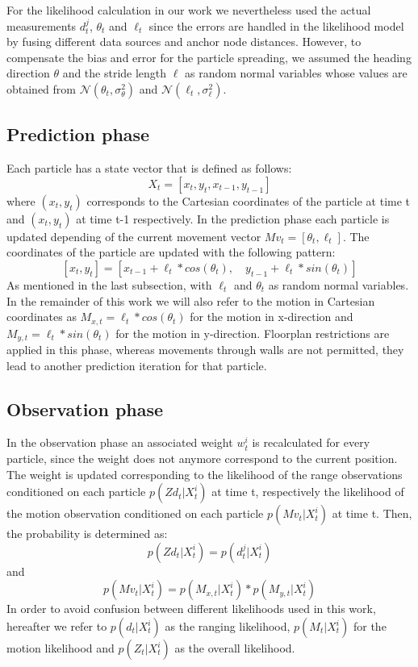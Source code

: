 For the likelihood calculation in our work we nevertheless used the actual measurements $d^{j}_{t}$, $\theta_{t}$ and $\ell_{t}$ since the errors are handled in the likelihood model by fusing different data sources and anchor node distances. However, to compensate the bias and error for the particle spreading, we assumed the heading direction $\theta$ and the stride length $\ell$ as random normal variables whose values are obtained from $\mathcal{N}(\theta_{t}, \sigma_{\theta}^{2})$ and $\mathcal{N}(\ell_{t}, \sigma_{\ell}^{2})$.



\subsection{Prediction phase}
Each particle has a state vector that is defined as follows:
$$X_{t} = [x_{t}, y_{t}, x_{t-1}, y_{t-1}]$$
where $(x_{t}, y_{t})$ corresponds to the Cartesian coordinates of the particle at time t and $(x_{t}, y_{t})$ at time t-1 respectively. In the prediction phase each particle is updated depending of the current movement vector $Mv_{t} = [\theta_{t}, \ell_{t}]$. The coordinates of the particle are updated with the following pattern:
$$[x_{t}, y_{t}]  = [x_{t-1} + \ell_{t} * cos(\theta_{t}),\quad y_{t-1} + \ell_{t} * sin(\theta_{t})]$$
As mentioned in the last subsection, with $\ell_{t}$ and $\theta_{t}$ as random normal variables. In the remainder of this work we will also refer to the motion in Cartesian coordinates as $M_{x,t} = \ell_{t} * cos(\theta_{t})$ for the motion in x-direction and $M_{y,t} = \ell_{t} * sin(\theta_{t})$ for the motion in y-direction.
Floorplan restrictions are applied in this phase, whereas movements through walls are not permitted, they lead to another prediction iteration for that particle.

\subsection{Observation phase}
In the observation phase an associated weight $w^{i}_{t}$ is recalculated for every particle, since the weight does not anymore correspond to the current position. The weight is updated corresponding to the likelihood of the range observations conditioned on each particle $p(Zd_{t} | X^{i}_{t})$ at time t, respectively the likelihood of the motion observation conditioned on each particle $p(Mv_{t} | X^{i}_{t})$ at time t. Then, the probability is determined as:
$$ p(Zd_{t} | X^{i}_{t}) = p(d_{t}^{j} | X^{i}_{t}) $$
and $$ p(Mv_{t} | X^{i}_{t}) = p(M_{x,t} | X^{i}_{t}) * p(M_{y,t} | X^{i}_{t})$$ %
In order to avoid confusion between different likelihoods used in this work, hereafter we refer to $p(d_{t} | X^{i}_{t})$ as the ranging likelihood, $p(M_{t} | X^{i}_{t})$ for the motion likelihood and $p(Z_{t} | X^{i}_{t})$ as the overall likelihood.

